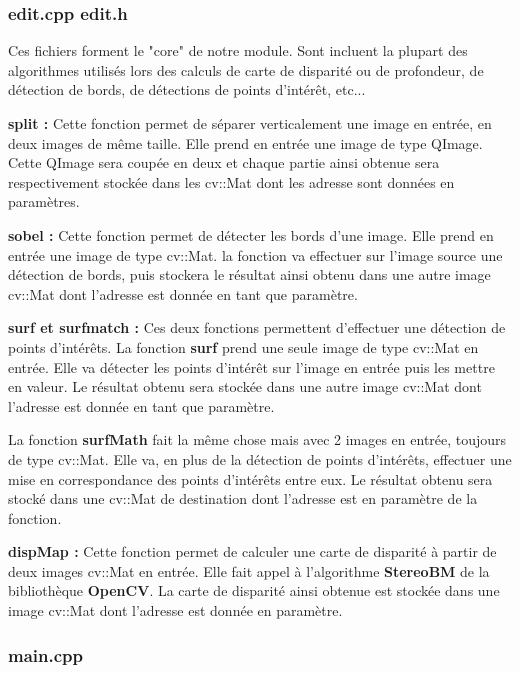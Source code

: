 \documentclass[a4paper]{article}
\begin{document}
\subsubsection*{edit.cpp edit.h}

Ces fichiers forment le "core" de notre module. Sont incluent la plupart des
algorithmes utilisés lors des calculs de carte de disparité ou de profondeur,
de détection de bords, de détections de points d'intérêt, etc...


\textbf{split :} Cette fonction permet de séparer verticalement une image en
entrée, en deux images de même taille. Elle prend en entrée une image de type
QImage. Cette QImage sera coupée en deux et chaque partie ainsi obtenue sera
respectivement stockée dans les cv::Mat dont les adresse sont données en paramètres.


\textbf{sobel :} Cette fonction permet de détecter les bords d'une image. Elle
prend en entrée une image de type cv::Mat. la fonction va effectuer sur l'image
source une détection de bords, puis stockera le résultat ainsi obtenu dans une
autre image cv::Mat dont l'adresse est donnée en tant que paramètre.


\textbf{surf et surfmatch :} Ces deux fonctions permettent d'effectuer une détection
de points d'intérêts. La fonction \textbf{surf} prend une seule image de type
cv::Mat en entrée. Elle va détecter les points d'intérêt sur l'image en entrée puis
les mettre en valeur. Le résultat obtenu sera stockée dans une autre image cv::Mat
dont l'adresse est donnée en tant que paramètre.


La fonction \textbf{surfMath} fait la même chose mais avec 2 images en entrée,
toujours de type cv::Mat. Elle va, en plus de la détection de points d'intérêts,
effectuer une mise en correspondance des points d'intérêts entre eux. Le résultat
obtenu sera stocké dans une cv::Mat de destination dont l'adresse est en paramètre
de la fonction.


\textbf{dispMap :} Cette fonction permet de calculer une carte de disparité à
partir de deux images cv::Mat en entrée. Elle fait appel à l'algorithme
\textbf{StereoBM} de la bibliothèque \textbf{OpenCV}. La carte de disparité ainsi
obtenue est stockée dans une image cv::Mat dont l'adresse est donnée en paramètre.

\subsubsection*{main.cpp}
\end{document}
